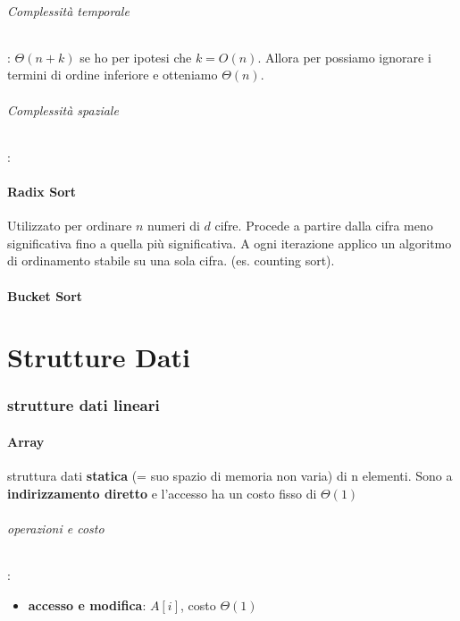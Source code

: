 \documentclass{article}
\begin{document}
\paragraph{Complessità temporale}: $\Theta(n+k)$ se ho per ipotesi che $k = O(n)$. Allora per possiamo ignorare i termini di ordine inferiore e otteniamo $\Theta(n)$.
\paragraph{Complessità spaziale}: 


\hypertarget{radix}{\subsection{Radix Sort}} %
Utilizzato per ordinare $n$ numeri di $d$ cifre. Procede a partire dalla cifra meno significativa fino a quella più significativa. A ogni iterazione applico un 
algoritmo di ordinamento stabile su una sola cifra. (es. counting sort).

\hypertarget{bucketsort}{\subsection{Bucket Sort}} %
\newpage
\part{Strutture Dati}
\section{strutture dati lineari} %
\subsection{Array} %
struttura dati \textbf{statica} (= suo spazio di memoria non varia) di n elementi. 
Sono a \textbf{indirizzamento diretto} e l'accesso ha un costo fisso di $\Theta (1)$
\paragraph{operazioni e costo}:
\begin{itemize}
    \item \textbf{accesso e modifica}: $A[i]$, costo $\Theta(1)$
\end{itemize}
\end{document}
